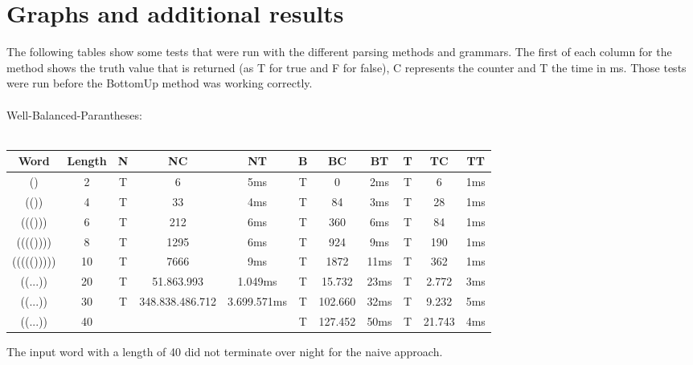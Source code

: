 \documentclass[a4paper, 11pt]{article}
\begin{document}







\newpage
\section{Graphs and additional results}
\label{previousresults}


The following tables show some tests that were run with the different parsing methods and grammars. The first of each column for the method shows the truth value that is returned (as T for true and F for false), C represents the counter and T the time in ms. Those tests were run before the BottomUp method was working correctly.
\\
\\
Well-Balanced-Parantheses: \\
\\
\begin{small}
\begin{tabular}{|c|c||c|c|c||c|c|c||c|c|c|}
\hline
Word & Length & N & NC & NT & B & BC & BT & T & TC & TT \\
\hline
\hline
() & 2 & T & 6 & 5ms & T & 0 & 2ms & T & 6 & 1ms \\
\hline
(()) & 4 & T & 33 & 4ms & T & 84 & 3ms & T & 28 & 1ms \\
\hline
((())) & 6 & T & 212 & 6ms & T & 360 & 6ms & T & 84 & 1ms \\
\hline
(((()))) & 8 & T & 1295 & 6ms & T & 924 & 9ms & T & 190 & 1ms \\
\hline
((((())))) & 10 & T & 7666 & 9ms & T & 1872 & 11ms & T & 362 & 1ms \\
\hline
((...)) & 20 & T & 51.863.993 & 1.049ms & T & 15.732 & 23ms & T & 2.772 & 3ms \\
\hline
((...)) & 30 & T & 348.838.486.712 & 3.699.571ms & T & 102.660 & 32ms & T & 9.232 & 5ms \\
\hline
((...)) & 40 & & & & T & 127.452 & 50ms & T & 21.743 & 4ms \\
\hline
\end{tabular}
\end{small}

The input word with a length of 40 did not terminate over night for the naive approach.
\end{document}
